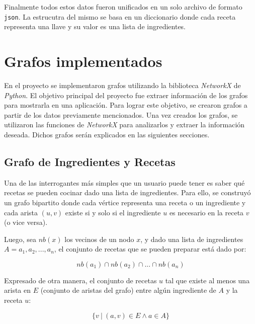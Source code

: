 \documentclass[a4paper]{article}
\begin{document}
Finalmente todos estos datos fueron unificados en un solo archivo de formato
\texttt{json}. La estrucutra del mismo se basa en un diccionario donde cada
receta representa una llave y su valor es una lista de ingredientes.


\section{Grafos implementados}\label{sec:graphs}

En el proyecto se implementaron grafos utilizando la biblioteca \emph{NetworkX}
de \emph{Python}. El objetivo principal del proyecto fue extraer información de
los grafos para mostrarla en una aplicación. Para lograr este objetivo, se
crearon grafos a partir de los datos previamente mencionados. Una vez creados
los grafos, se utilizaron las funciones de \emph{NetworkX} para analizarlos y
extraer la información deseada. Dichos grafos serán explicados en las siguientes
secciones.

\subsection{Grafo de Ingredientes y Recetas}\label{sub:ing-recip-graph}

Una de las interrogantes más simples que un usuario puede tener es saber
qué recetas se pueden cocinar dado una lista de ingredientes. Para ello,
se construyó un grafo bipartito donde cada vértice representa una receta
o un ingrediente y cada arista $(u, v)$ existe si y solo si el ingrediente
$u$ es necesario en la receta $v$ (o vice versa).

Luego, sea $nb(x)$ los vecinos de un nodo $x$, y dado una lista de ingredientes
$A = a_1, a_2, ..., a_n$, el conjunto de recetas que se pueden preparar está dado
por:

$$ nb(a_1) \cap nb(a_2) \cap ... \cap nb(a_n)$$

Expresado de otra manera, el conjunto de recetas $u$ tal que existe al menos
una arista en $E$ (conjunto de aristas del grafo) entre algún ingrediente de
$A$ y la receta $u$:

$$ \{v ~|~ (a, v) \in E \wedge a \in A \} $$

\end{document}

